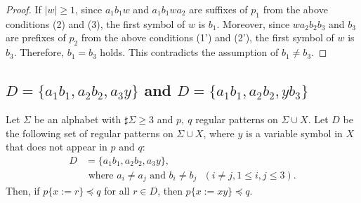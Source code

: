 \begin{proof}
If $|w| \ge 1$, since $a_{1}b_{1}w$ and $a_{1}b_{1}wa_{2}$ are suffixes of $p_{1}$ from the above conditions (2) and (3), the first symbol of $w$ is $b_{1}$.
Moreover, since $wa_{2}b_{2}b_{3}$ and $b_{3}$ are prefixes of $p_{2}$ from the above conditions (1') and (2'),
the first symbol of $w$ is $b_{3}$.
Therefore, $b_{1}=b_{3}$ holds.
This contradicts the assumption of $b_{1} \ne b_{3}$.
\end{proof}

\subsection{$D = \{ a_{1}b_{1}, a_{2}b_{2}, a_{3}y\}$ and $D = \{ a_{1}b_{1}, a_{2}b_{2}, yb_{3}\}$}\label{subsec:d3c}


\begin{lem}\label{lem:3consts_ii}
  Let $\Sigma$ be an alphabet with $\sharp\Sigma \ge 3$ and $p,~q$ regular patterns on $\Sigma\cup X$.
  Let $D$ be the following set of regular patterns on $\Sigma\cup X$, where $y$ is a variable symbol in $X$ that does not appear in $p$ and $q$:
  \begin{align*}
  D & = \{ a_{1}b_{1}, a_{2}b_{2}, a_{3}y\},\\
  & \mbox{ where } a_{i} \ne a_{j} \mbox{ and } b_{i} \ne b_{j} \mbox{ } (i\ne j, 1\le i,j\le 3).
  \end{align*}
  Then, if $p \{ x := r \} \preceq q$ for all $r \in D$, then $p \{ x := xy \} \preceq q$.
\end{lem}

